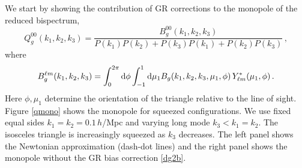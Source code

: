 {{{We start by showing the contribution of GR corrections to
the monopole of the reduced   bispectrum,
\begin{equation} \label{redb}
Q^{00}_g(k_1,k_2,k_3) = \frac{ B^{00}_g(k_1,k_2,k_3)}{P(k_1)P(k_2)+ P(k_3)P(k_1)+ P(k_2)P(k_3) }\,,
\end{equation}
where \cite{deWeerd:2019cae}
\begin{equation} \label{monob}
B^{\ell m}_g(k_1,k_2,k_3)= \int_0^{2\pi} \mathrm{d}\phi \int_{-1}^1 \mathrm{d}\mu_1 B_g(k_1,k_2,k_3,\mu_1,\phi)\,Y^*_{\ell m}(\mu_1,\phi) \,.
\end{equation}
Here $\phi,\mu_1$ determine the orientation of the triangle relative to the line of sight. 
Figure \ref{qmono} shows the monopole
for squeezed configurations. We use fixed equal sides 
$k_1=k_2=0.1\,h$/Mpc and varying long mode $k_3<k_1=k_2$. The isosceles triangle is increasingly squeezed as $k_3$ decreases. 
The left panel shows the Newtonian approximation (dash-dot lines) and the right panel shows the monopole without the GR bias correction \eqref{dg2b}. 

}}}
